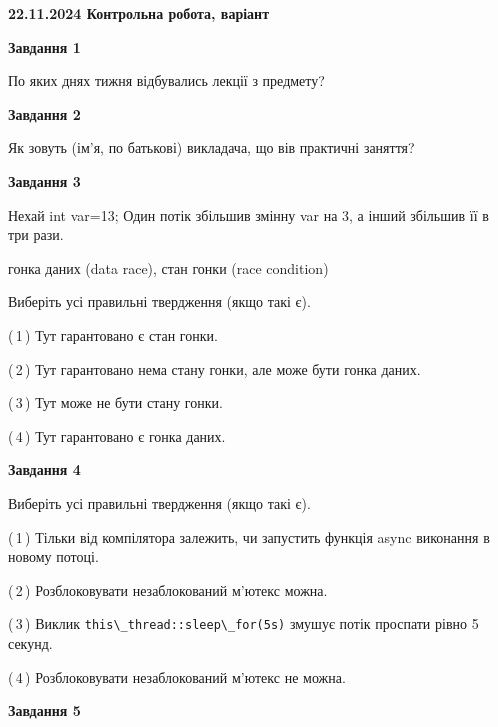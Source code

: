 \documentclass[12pt, ukrainian]{article}
\def\code#1{\Verb!#1!}
\begin{document}
\begin {large}

\textbf{22.11.2024 Контрольна робота, варіант  }\par


{

\begin{center}
\textbf{Завдання 1}
\end{center}

По яких днях тижня відбувались лекції з предмету?


\begin{center}
\textbf{Завдання 2}
\end{center}

Як зовуть (ім'я, по батькові) викладача, що вів практичні заняття?


\begin{center}
\textbf{Завдання 3}
\end{center}

Нехай int var=13; Один потік збільшив змінну var на 3, а інший збільшив її в три рази.

гонка даних (data race), стан гонки (race condition)

Виберіть усі правильні твердження (якщо такі є).\par
\vspace{2mm}
(\,1\,) Тут гарантовано є стан гонки.%

(\,2\,) Тут гарантовано нема стану гонки, але може бути гонка даних.%

(\,3\,) Тут може не бути стану гонки.%

(\,4\,) Тут гарантовано є гонка даних.%


\begin{center}
\textbf{Завдання 4}
\end{center}

Виберіть усі правильні твердження (якщо такі є).\par
\vspace{2mm}

(\,1\,) Тільки від компілятора залежить, чи запустить функція async виконання в новому потоці.%

(\,2\,) Розблоковувати незаблокований м’ютекс можна.%

(\,3\,) Виклик \code{this\_thread::sleep\_for(5s)} змушує потік проспати рівно 5 секунд.%

(\,4\,) Розблоковувати незаблокований м’ютекс не можна.%


\begin{center}
\textbf{Завдання 5}
\end{center}

}
\end{large}
\end{document}

